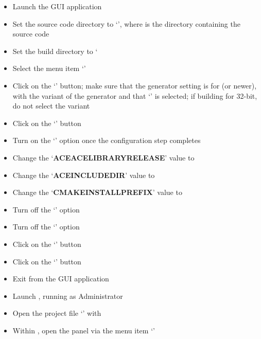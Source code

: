 \begin{itemize}
\item Launch the  GUI application
\item\exSp{}Set the source code directory to `',
where  is the directory containing the \mplusm{} source code
\item\exSp{}Set the build directory to `
\item\exSp{}Select the menu item `'
\item\exSp{}Click on the `' button; make sure that the generator
setting is for  (or newer), with the  variant of
the generator and that `' is selected; if building
for 32-bit, do not select the  variant
\item\exSp{}Click on the `' button
\item\exSp{}Turn on the `' option once the configuration step completes
\item\exSp{}Change the `\textbf{ACE\fUS{}ACE\fUS{}LIBRARY\fUS{}RELEASE}' value to
\item\exSp{}Change the `\textbf{ACE\fUS{}INCLUDE\fUS{}DIR}' value to
\item\exSp{}Change the `\textbf{CMAKE\fUS{}INSTALL\fUS{}PREFIX}' value to
\item\exSp{}Turn off the `' option
\item\exSp{}Turn off the `' option
\item\exSp{}Click on the `' button
\item\exSp{}Click on the `' button
\item\exSp{}Exit from the  GUI application
\item\exSp{}Launch , running as Administrator
\item\exSp{}Open the project file
`' with
\item\exSp{}Within , open the  panel via the
menu item `'

\end{itemize}
